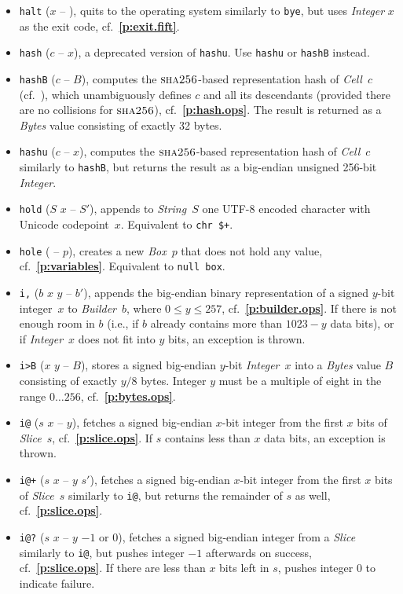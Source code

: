 \documentclass[12pt,oneside]{article}
\def\refpoint#1{{\rm\textbf{\ref{#1}}}}
\let\ptref=\refpoint
\def\opsc#1{\operatorname{\textsc{#1}}}
\def\Sha{\opsc{sha256}}
\begin{document}
\begin{itemize}
\item {\tt halt} ($x$ -- ), quits to the operating system similarly to {\tt bye}, but uses {\em Integer\/} $x$ as the exit code, cf.~\ptref{p:exit.fift}.
\item {\tt hash} ($c$ -- $x$), a deprecated version of {\tt hashu}. Use {\tt hashu} or {\tt hashB} instead.
\item {\tt hashB} ($c$ -- $B$), computes the $\Sha$-based representation hash of {\em Cell\/}~$c$ (cf.~\cite[3.1]{TVM}), which unambiguously defines $c$ and all its descendants (provided there are no collisions for $\Sha$), cf.~\ptref{p:hash.ops}. The result is returned as a {\em Bytes\/} value consisting of exactly 32 bytes.
\item {\tt hashu} ($c$ -- $x$), computes the $\Sha$-based representation hash of {\em Cell\/}~$c$ similarly to {\tt hashB}, but returns the result as a big-endian unsigned 256-bit {\em Integer}.
\item {\tt hold} ($S$ $x$ -- $S'$), appends to {\em String\/}~$S$ one UTF-8 encoded character with Unicode codepoint~$x$. Equivalent to {\tt chr \$+}.
\item {\tt hole} ( -- $p$), creates a new {\em Box\/}~$p$ that does not hold any value, cf.~\ptref{p:variables}. Equivalent to {\tt null box}.
\item {\tt i,} ($b$ $x$ $y$ -- $b'$), appends the big-endian binary representation of a signed $y$-bit integer~$x$ to {\em Builder\/}~$b$, where $0\leq y\leq 257$, cf.~\ptref{p:builder.ops}. If there is not enough room in $b$ (i.e., if $b$ already contains more than $1023-y$ data bits), or if {\em Integer\/}~$x$ does not fit into $y$ bits, an exception is thrown.
\item {\tt i>B} ($x$ $y$ -- $B$), stores a signed big-endian $y$-bit {\em Integer\/}~$x$ into a {\em Bytes\/} value $B$ consisting of exactly $y/8$ bytes. Integer $y$ must be a multiple of eight in the range $0\ldots256$, cf.~\ptref{p:bytes.ops}.
\item {\tt i@} ($s$ $x$ -- $y$), fetches a signed big-endian $x$-bit integer from the first $x$ bits of {\em Slice}~$s$, cf.~\ptref{p:slice.ops}. If $s$ contains less than $x$ data bits, an exception is thrown.
\item {\tt i@+} ($s$ $x$ -- $y$ $s'$), fetches a signed big-endian $x$-bit integer from the first $x$ bits of {\em Slice}~$s$ similarly to {\tt i@}, but returns the remainder of $s$ as well, cf.~\ptref{p:slice.ops}.
\item {\tt i@?} ($s$ $x$ -- $y$ $-1$ or $0$), fetches a signed big-endian integer from a {\em Slice\/} similarly to {\tt i@}, but pushes integer $-1$ afterwards on success, cf.~\ptref{p:slice.ops}. If there are less than $x$ bits left in $s$, pushes integer $0$ to indicate failure.

\end{itemize}
\end{document}
